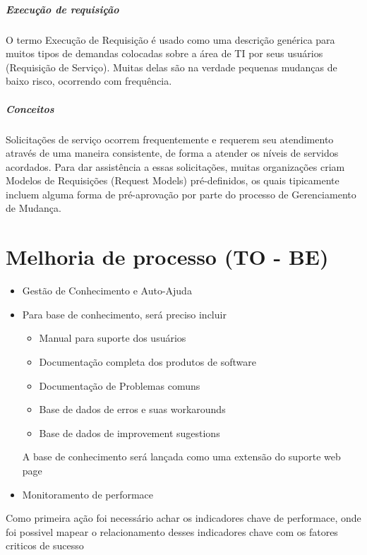 \documentclass[11pt,a4paper]{article}
\begin{document}
\subparagraph{Execução de requisição}
O termo Execução de Requisição é usado como uma descrição genérica para muitos tipos de demandas colocadas sobre a área de TI por seus usuários (Requisição de Serviço).
Muitas delas são na verdade pequenas mudanças de baixo risco, ocorrendo com frequência.



\subparagraph*{Conceitos}
Solicitações de serviço ocorrem frequentemente e requerem seu atendimento através de
uma maneira consistente, de forma a atender os níveis de servidos acordados. Para dar
assistência a essas solicitações, muitas organizações criam Modelos de Requisições (Request
Models) pré-definidos, os quais tipicamente incluem alguma forma de pré-aprovação por
parte do processo de Gerenciamento de Mudança.












\section{ Melhoria de processo (TO - BE)}

\begin{itemize}[noitemsep]
	\item Gestão de Conhecimento e Auto-Ajuda
	\item	Para base de conhecimento, será preciso incluir
	\begin{itemize}[noitemsep]
		\item Manual para suporte dos usuários
		\item Documentação completa dos produtos de software
		\item Documentação de Problemas comuns
		\item Base de dados de erros e suas workarounds
		\item Base de dados de improvement sugestions
	\end{itemize}
	A base de conhecimento será lançada como uma extensão do
	suporte web page
	\item Monitoramento de performace
\end{itemize}


Como primeira ação foi necessário achar os indicadores chave de performace,
onde foi possivel mapear o relacionamento desses indicadores chave com os fatores
\cite{cartlidge2007introductory} criticos de sucesso











\end{document}
